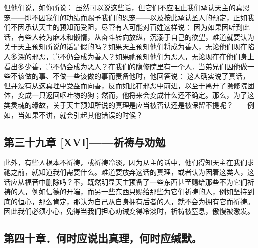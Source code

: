 但他们说，如你所说： 虽然可以说这些话，但它们不应阻止我们承认天主的真恩宠——即不因我们的功绩而赐予我们的恩宠——以及按此承认圣人的预定，正如我们不因承认天主的预知而受阻，尽管有人可能对百姓这样说： 因为如果因听到此话，有些人转为麻木和懒惰，从奋斗转向放纵，沉溺于自己的欲望，难道就要认为关于天主预知所说的话是假的吗？如果天主预知他们将成为善人，无论他们现在陷入多深的邪恶，岂不仍会成为善人？如果祂预知他们为恶人，无论现在在他们身上看出多少善，岂不仍会成为恶人？在我们的隐修院里有一个人，当弟兄们因他做一些不该做的事、不做一些该做的事而责备他时，他回答说： 这人确实说了真话，但并没有从这真理中受益而向善，反而如此在邪恶中前进，以至于离开了隐修院团体，变成一只返回呕吐物的狗；然而，他将来会变成什么还不确定。那么，为了这类灵魂的缘故，关于天主预知所说的真理是应当被否认还是被保留不提呢？——例如，当如果不讲，就会引起其他错误的时候？\par


\subsection{第三十九章 [XVI]——祈祷与劝勉}

此外，有些人根本不祈祷，或祈祷冷淡，因为从主的话中，他们得知天主在我们求祂之前，就知道我们需要什么。难道要放弃这话的真理，或者认为因着这类人，这话应从福音中删除吗？不，既然明显天主预备了一些东西甚至赐给那些不为它们祈祷的人，例如信德的开端，而另一些东西只赐给那些为它们祈祷的人，例如坚持到底的恒心，那么肯定，那认为自己从自身拥有后者的人，就不会为拥有它而祈祷。因此我们必须小心，免得当我们担心劝诫变得冷淡时，祈祷被窒息，傲慢被激发。\par


\subsection{第四十章．何时应说出真理，何时应缄默。}

